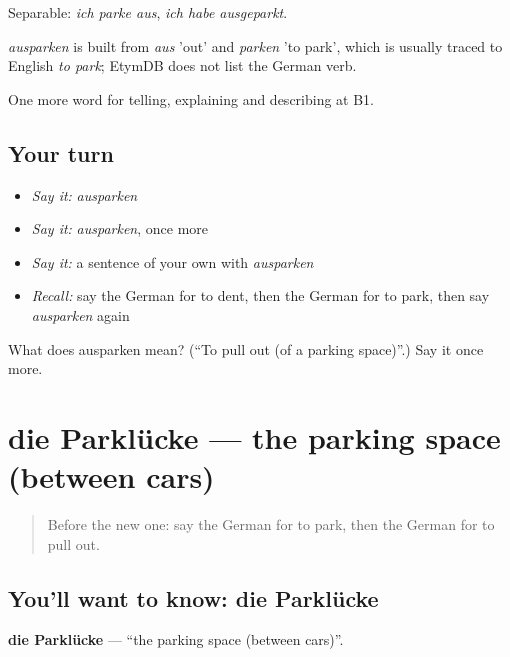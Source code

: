 Separable: \emph{ich parke aus}, \emph{ich habe ausgeparkt}.

\begin{cousinweb}
\emph{ausparken} is built from \emph{aus} 'out' and \emph{parken} 'to park', which is usually traced to English \emph{to park}; EtymDB does not list the German verb.
\end{cousinweb}

\begin{grammarlens}[title={What you've built}]
One more word for telling, explaining and describing at B1.
\end{grammarlens}

\subsection*{Your turn}
\begin{itemize}
\raggedright
  \item \emph{Say it:} \emph{ausparken}
  \item \emph{Say it:} \emph{ausparken}, once more
  \item \emph{Say it:} a sentence of your own with \emph{ausparken}
  \item \emph{Recall:} say the German for to dent, then the German for to park, then say \emph{ausparken} again
\end{itemize}

\begin{tcolorbox}[breakable,colback=teal!4,colframe=teal!35!black,title={Before you move on}]
What does ausparken mean? (\textquotedblleft{}To pull out (of a parking space)\textquotedblright{}.) Say it once more.
\end{tcolorbox}
\section[die Parklücke]{die Parklücke — the parking space (between cars)}

\label{lesson:GE-C406-parkluecke}



\begin{quote}
Before the new one: say the German for to park, then the German for to pull out.
\end{quote}

\subsection*{You'll want to know: die Parklücke}
\textbf{die Parklücke} — \textquotedblleft{}the parking space (between cars)\textquotedblright{}.

